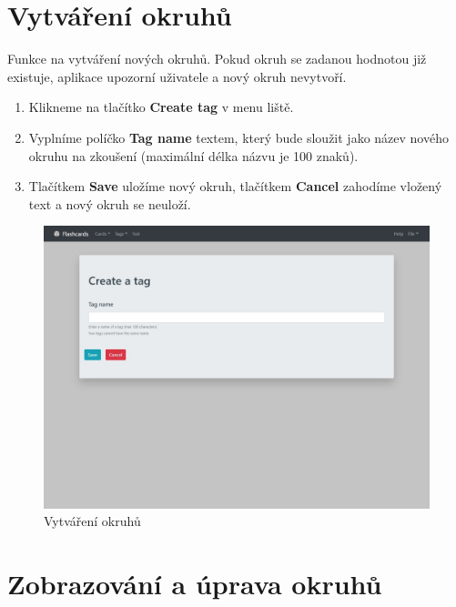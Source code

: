\documentclass[11pt]{article}
\providecommand{\tightlist}{\setlength{\itemsep}{1pt}\setlength{\parskip}{1pt}}
\begin{document}
\hypertarget{vytvuxe1ux159enuxed-okruhux16f}{%
\section{Vytváření okruhů}\label{vytvuxe1ux159enuxed-okruhux16f}}

Funkce na vytváření nových okruhů. Pokud okruh se zadanou hodnotou již
existuje, aplikace upozorní uživatele a nový okruh nevytvoří.

\begin{enumerate}
\def\labelenumi{\arabic{enumi}.}
\tightlist
\item
  Klikneme na tlačítko \textbf{Create tag} v menu liště.
\item
  Vyplníme políčko \textbf{Tag name} textem, který bude sloužit jako
  název nového okruhu na zkoušení (maximální délka názvu je 100 znaků).
\item
  Tlačítkem \textbf{Save} uložíme nový okruh, tlačítkem \textbf{Cancel}
  zahodíme vložený text a nový okruh se neuloží.
\end{enumerate}

\begin{figure}
\centering
\includegraphics{../../../../assets/create_tag.jpg}
\caption{Vytváření okruhů}
\end{figure}

\hypertarget{zobrazovuxe1nuxed-a-uxfaprava-okruhux16f}{%
\section{Zobrazování a úprava
okruhů}\label{zobrazovuxe1nuxed-a-uxfaprava-okruhux16f}}
\end{document}

